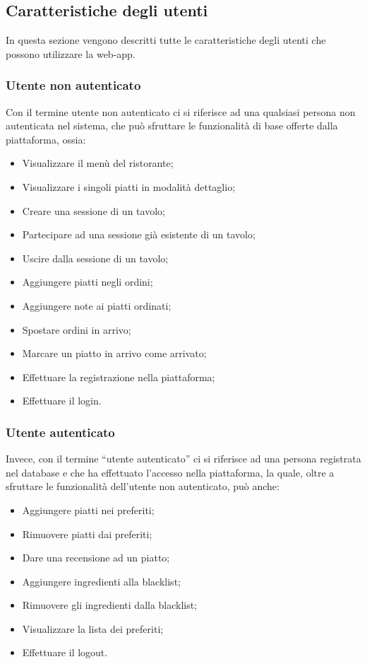 \subsection{Caratteristiche degli utenti}
In questa sezione vengono descritti tutte le caratteristiche degli utenti che possono utilizzare la web-app.
\subsubsection{Utente non autenticato}
Con il termine utente non autenticato ci si riferisce ad una qualsiasi persona non autenticata nel sistema, che può sfruttare le funzionalità di base offerte dalla piattaforma, ossia:
\begin{itemize}
    \item Visualizzare il menù del ristorante;
    \item Visualizzare i singoli piatti in modalità dettaglio;
    \item Creare una sessione di un tavolo;
    \item Partecipare ad una sessione già esistente di un tavolo;
    \item Uscire dalla sessione di un tavolo;
    \item Aggiungere piatti negli ordini;
    \item Aggiungere note ai piatti ordinati;
    \item Spostare ordini in arrivo;
    \item Marcare un piatto in arrivo come arrivato;
    \item Effettuare la registrazione nella piattaforma;
    \item Effettuare il login.
\end{itemize}
\subsubsection{Utente autenticato}
Invece, con il termine “utente autenticato” ci si riferisce ad una persona registrata nel database e che ha effettuato l'accesso nella piattaforma, la quale, oltre a sfruttare le funzionalità dell'utente non autenticato, può anche:
\begin{itemize}
    \item Aggiungere piatti nei preferiti;
    \item Rimuovere piatti dai preferiti;
    \item Dare una recensione ad un piatto;
    \item Aggiungere ingredienti alla blacklist;
    \item Rimuovere gli ingredienti dalla blacklist;
    \item Visualizzare la lista dei preferiti;
    \item Effettuare il logout.
\end{itemize}
